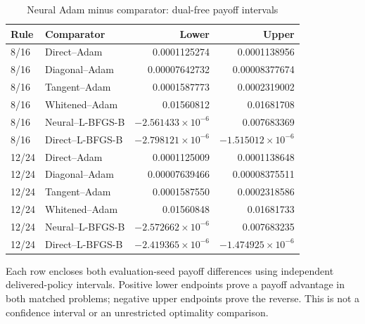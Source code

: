 \begin{table}[htbp]\centering\small
\caption{Neural Adam minus comparator: dual-free payoff intervals}\label{tab:r24pairwise}
\begin{tabular}{llrr}\toprule
Rule & Comparator & Lower & Upper\\\midrule
8/16 & Direct--Adam & 0.0001125274 & 0.0001138956\\
8/16 & Diagonal--Adam & 0.00007642732 & 0.00008377674\\
8/16 & Tangent--Adam & 0.0001587773 & 0.0002319002\\
8/16 & Whitened--Adam & 0.01560812 & 0.01681708\\
8/16 & Neural--L-BFGS-B & $-2.561433\times10^{-6}$ & 0.007683369\\
8/16 & Direct--L-BFGS-B & $-2.798121\times10^{-6}$ & $-1.515012\times10^{-6}$\\
12/24 & Direct--Adam & 0.0001125009 & 0.0001138648\\
12/24 & Diagonal--Adam & 0.00007639466 & 0.00008375511\\
12/24 & Tangent--Adam & 0.0001587550 & 0.0002318586\\
12/24 & Whitened--Adam & 0.01560848 & 0.01681733\\
12/24 & Neural--L-BFGS-B & $-2.572662\times10^{-6}$ & 0.007683235\\
12/24 & Direct--L-BFGS-B & $-2.419365\times10^{-6}$ & $-1.474925\times10^{-6}$\\
\bottomrule\end{tabular}
\par\smallskip\begin{minipage}{.97\textwidth}\footnotesize Each row encloses both evaluation-seed payoff differences using independent delivered-policy intervals. Positive lower endpoints prove a payoff advantage in both matched problems; negative upper endpoints prove the reverse. This is not a confidence interval or an unrestricted optimality comparison.\end{minipage}
\end{table}
